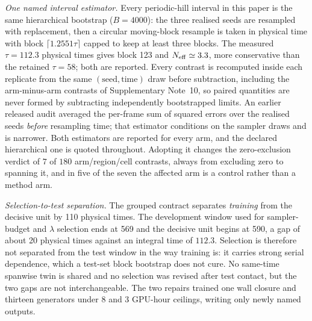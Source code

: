 \emph{One named interval estimator.} Every periodic-hill interval in this paper is the same
hierarchical bootstrap ($B=4000$): the three realised seeds are resampled with replacement, then
a circular moving-block resample is taken in physical time with block
$\lceil1.2551\tau\rceil$ capped to keep at least three blocks. The measured $\tau=112.3$ physical
times gives block 123 and $N_{\rm eff}\simeq3.3$, more conservative than the retained $\tau=58$;
both are reported. Every contrast is recomputed inside each replicate from the same
$(\text{seed},\text{time})$ draw before subtraction, including the arm-minus-arm contrasts of
Supplementary Note~10, so paired quantities are never formed by subtracting independently
bootstrapped limits. An earlier released audit averaged the per-frame sum of squared errors over
the realised seeds \emph{before} resampling time; that estimator conditions on the sampler draws
and is narrower. Both estimators are reported for every arm, and the declared hierarchical one is
quoted throughout. Adopting it changes the zero-exclusion verdict of $7$ of $180$
arm/region/cell contrasts, always from excluding zero to spanning it, and in five of the seven
the affected arm is a control rather than a method arm.

\emph{Selection-to-test separation.} The grouped contract separates \emph{training} from the
decisive unit by 110 physical times. The development window used for sampler-budget and $\lambda$
selection ends at 569 and the decisive unit begins at 590, a gap of about 20 physical times
against an integral time of $112.3$. Selection is therefore not separated from the test window in
the way training is: it carries strong serial dependence, which a test-set block bootstrap does
not cure. No same-time spanwise twin is shared and no selection was revised after test contact,
but the two gaps are not interchangeable. The two repairs trained one wall closure and thirteen
generators under 8 and 3 GPU-hour ceilings, writing only newly named outputs.

